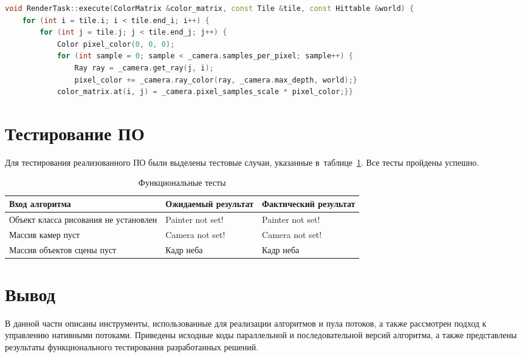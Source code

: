 \begin{lstlisting}[language=C++, caption={Исходный код реализации алгоритма генерации части изображения представлен в листинге}, captionpos=b, label=list:part]
void RenderTask::execute(ColorMatrix &color_matrix, const Tile &tile, const Hittable &world) {
	for (int i = tile.i; i < tile.end_i; i++) {
		for (int j = tile.j; j < tile.end_j; j++) {
			Color pixel_color(0, 0, 0);
			for (int sample = 0; sample < _camera.samples_per_pixel; sample++) {
				Ray ray = _camera.get_ray(j, i);
				pixel_color += _camera.ray_color(ray, _camera.max_depth, world);}
			color_matrix.at(i, j) = _camera.pixel_samples_scale * pixel_color;}}
\end{lstlisting}


\section{Тестирование ПО}
Для тестирования реализованного ПО были выделены тестовые случаи, указанные в~таблице~\ref{tab:functional_tests}. Все тесты пройдены успешно.
\begin{table}[H]
	\centering
	\caption{Функциональные тесты}
	\label{tab:functional_tests}
	\begin{tabular}{|p{5.1cm}|p{5.3cm}|p{5.3cm}|}
		\hline
		\textbf{Вход алгоритма} & \textbf{Ожидаемый результат} & \textbf{Фактический результат} \\
		\hline
		Объект класса рисования не установлен & Painter not set! & Painter not set! \\
		\hline
		Массив камер пуст & Camera not set! & Camera not set! \\
		\hline
		Массив объектов сцены пуст & Кадр неба & Кадр неба \\
		\hline
	\end{tabular}
\end{table}

\section*{Вывод}
В данной части описаны инструменты, использованные для реализации алгоритмов и пула потоков, а также рассмотрен подход к управлению нативными потоками. Приведены исходные коды параллельной и последовательной версий алгоритма, а также представлены результаты функционального тестирования разработанных решений.

\clearpage
